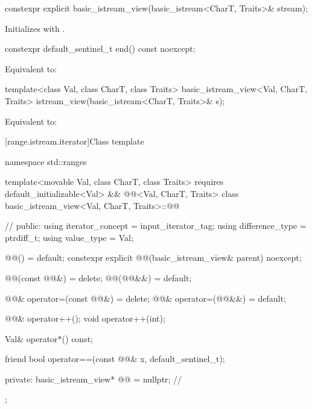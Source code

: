 %
\begin{itemdecl}
constexpr explicit basic_istream_view(basic_istream<CharT, Traits>& stream);
\end{itemdecl}

\begin{itemdescr}
\pnum
\effects
Initializes  with .
\end{itemdescr}

%
\begin{itemdecl}
constexpr default_sentinel_t end() const noexcept;
\end{itemdecl}

\begin{itemdescr}
\pnum
\effects
Equivalent to: 
\end{itemdescr}

%
\begin{itemdecl}
template<class Val, class CharT, class Traits>
basic_istream_view<Val, CharT, Traits> istream_view(basic_istream<CharT, Traits>& s);
\end{itemdecl}

\begin{itemdescr}
\pnum
\effects
Equivalent to: 
\end{itemdescr}

[range.istream.iterator]{Class template }

%
\begin{codeblock}
namespace std::ranges {
  template<movable Val, class CharT, class Traits>
    requires default_initializable<Val> &&
             @@<Val, CharT, Traits>
  class basic_istream_view<Val, CharT, Traits>::@@ {      // \expos
  public:
    using iterator_concept = input_iterator_tag;
    using difference_type = ptrdiff_t;
    using value_type = Val;

    @@() = default;
    constexpr explicit @@(basic_istream_view& parent) noexcept;

    @@(const @@&) = delete;
    @@(@@&&) = default;

    @@& operator=(const @@&) = delete;
    @@& operator=(@@&&) = default;

    @@& operator++();
    void operator++(int);

    Val& operator*() const;

    friend bool operator==(const @@& x, default_sentinel_t);

  private:
    basic_istream_view* @@ = nullptr;                      // \expos
  };
}
\end{codeblock}

